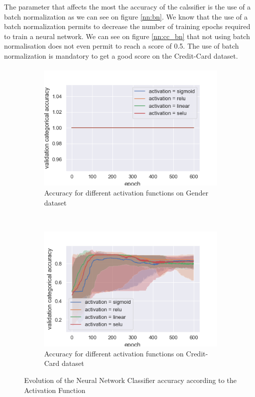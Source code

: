 \documentclass[10pt]{article}
\begin{document}
			The parameter that affects the most the accuracy of the calssifier is the use of a batch normalization as we can see on figure \ref{nn:bn}. We know that the use of a batch normalization permits to decrease the number of training epochs required to train a neural network. We can see on figure \ref{nn:cc_bn} that not using batch normalisation does not even permit to reach a score of 0.5. The use of batch normalization is mandatory to get a good score on the Credit-Card dataset.
		\paragraph*{}
			\begin{figure}[h]
				\centering
				\begin{subfigure}[]{0.45\columnwidth}
					\centering
					\includegraphics[width=\linewidth]{../graphics/per_gender_epoch_score_type_activation.png}
					\caption{Accuracy for different activation functions on Gender dataset}
					\label{nn:g_act}
				\end{subfigure}
				~
				\begin{subfigure}[]{0.45\columnwidth}
					\centering
					\includegraphics[width=\linewidth]{../graphics/per_creditcard_epoch_score_type_activation.png}
					\caption{Accuracy for different activation functions on Credit-Card dataset}
					\label{nn:cc_act}
				\end{subfigure}
				\caption{Evolution of the Neural Network Classifier accuracy according to the Activation Function}
				\label{nn:activation}
			\end{figure}
\end{document}
